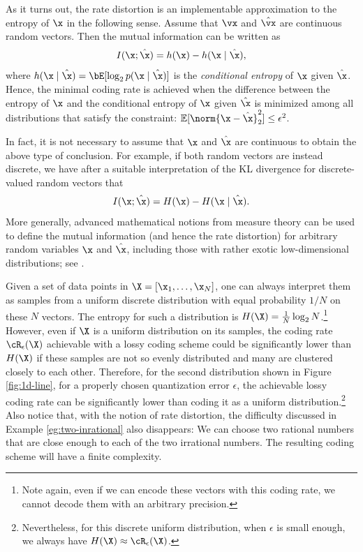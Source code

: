 \documentclass[../../book-main.tex]{subfiles}
\begin{document}
\begin{remark}
	As it turns out, the rate distortion is an implementable
	approximation to the entropy of $\x$ in the following sense.
	Assume that $\vx$ and $\hat{\vx}$ are continuous random vectors.
	Then the mutual information can be written as
	\begin{equation}\label{eq:information-entropy}
		I(\x; \hat\x) = h(\x) - h(\x \mid \hat \x),
	\end{equation}
	where $h(\x \mid \hat \x) = \bE[\log_2 p(\x \mid \hat\x)]$ is the
	\textit{conditional entropy} of $\x$ given $\hat \x$.
	Hence, the minimal coding rate is achieved when the difference between the
	entropy of $\x$ and the conditional entropy of $\x$ given $\hat \x$
	is minimized among all distributions that satisfy
	the constraint: $\mathbb{E} [\norm{\x- \hat \x}_2^2] \le \epsilon^2$. 

	In fact, it is not necessary to assume that $\x$ and $\hat \x$ are continuous
	to obtain the above type of conclusion. For example, if both random vectors
	are instead discrete, we have after a suitable interpretation of the KL
	divergence for discrete-valued random vectors that
	\begin{equation}
		I(\x; \hat\x) = H(\x) - H(\x \mid \hat \x).
	\end{equation}
	More generally, advanced mathematical notions from measure theory can be
	used to define the mutual information (and hence the rate distortion) for
	arbitrary random variables $\x$ and $\hat \x$, including those with rather
	exotic low-dimensional distributions; see \textcite[\S 8.5]{Cover-Thomas}.
\end{remark}

\begin{remark}
    Given a set of data points in $\X = [\x_1,\ldots, \x_N]$, one can always
	interpret them as samples from a uniform discrete distribution with equal
	probability $1/N$ on these $N$ vectors. The entropy for such a distribution
	is $H(\X) = \frac{1}{N}\log_2 N$.\footnote{Note again, even if we can encode
	these vectors with this coding rate, we cannot decode them with an arbitrary
	precision.} However, even if $\X$ is  a uniform distribution on its samples,
	the coding rate $\cR_{\epsilon}(\X)$ achievable with a lossy coding scheme
	could be significantly lower than $H(\X)$ if these samples are not so evenly
	distributed and many are clustered closely to each other. Therefore, for the
	second distribution shown in Figure \ref{fig:1d-line}, for a properly chosen
	quantization error  $\epsilon$, the achievable lossy coding rate can be
	significantly lower than coding it as a uniform
	distribution.\footnote{Nevertheless, for this discrete uniform distribution,
	when $\epsilon$ is small enough, we always have $H(\X) \approx \cR_{\epsilon}(\X)$.} Also notice that, with the notion of rate distortion, the difficulty discussed in Example \ref{eg:two-inrational} also disappears: We can choose two rational numbers that are close enough to each of the two irrational numbers. The resulting coding scheme will have a finite complexity. 
\end{remark}
\end{document}
